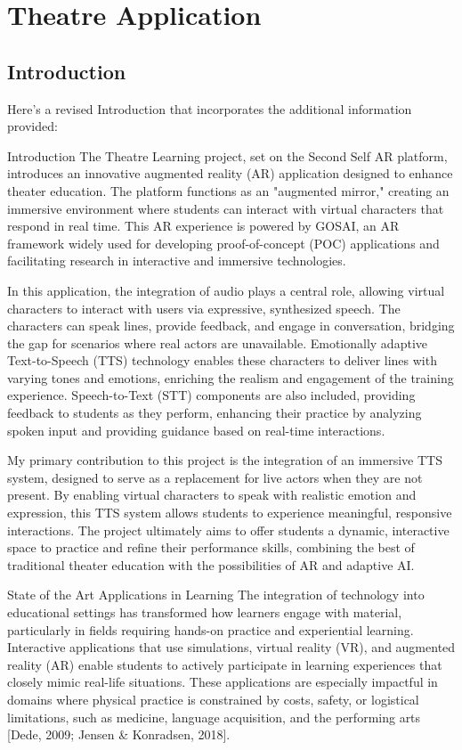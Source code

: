 \section{Theatre Application}

\subsection{Introduction}

Here’s a revised Introduction that incorporates the additional information provided:

Introduction
The Theatre Learning project, set on the Second Self AR platform, introduces an innovative augmented reality (AR) application designed to enhance theater education. The platform functions as an "augmented mirror," creating an immersive environment where students can interact with virtual characters that respond in real time. This AR experience is powered by GOSAI, an AR framework widely used for developing proof-of-concept (POC) applications and facilitating research in interactive and immersive technologies.

In this application, the integration of audio plays a central role, allowing virtual characters to interact with users via expressive, synthesized speech. The characters can speak lines, provide feedback, and engage in conversation, bridging the gap for scenarios where real actors are unavailable. Emotionally adaptive Text-to-Speech (TTS) technology enables these characters to deliver lines with varying tones and emotions, enriching the realism and engagement of the training experience. Speech-to-Text (STT) components are also included, providing feedback to students as they perform, enhancing their practice by analyzing spoken input and providing guidance based on real-time interactions.

My primary contribution to this project is the integration of an immersive TTS system, designed to serve as a replacement for live actors when they are not present. By enabling virtual characters to speak with realistic emotion and expression, this TTS system allows students to experience meaningful, responsive interactions. The project ultimately aims to offer students a dynamic, interactive space to practice and refine their performance skills, combining the best of traditional theater education with the possibilities of AR and adaptive AI.

State of the Art
Applications in Learning
The integration of technology into educational settings has transformed how learners engage with material, particularly in fields requiring hands-on practice and experiential learning. Interactive applications that use simulations, virtual reality (VR), and augmented reality (AR) enable students to actively participate in learning experiences that closely mimic real-life situations. These applications are especially impactful in domains where physical practice is constrained by costs, safety, or logistical limitations, such as medicine, language acquisition, and the performing arts [Dede, 2009; Jensen & Konradsen, 2018].

